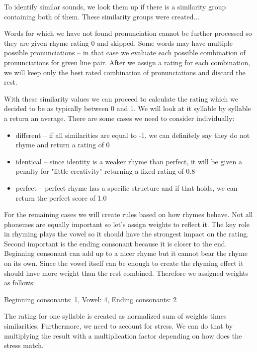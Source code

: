To identify similar sounds, we look them up if there is a similarity group containing both of them. These similarity groups were created... 

Words for which we have not found pronunciation cannot be further processed so they are given rhyme rating 0 and skipped. Some words may have multiple possible pronunciations -- in that case we evaluate each possible combination of pronunciations for given line pair. After we assign a rating for each combination, we will keep only the best rated combination of pronunciations and discard the rest. 


With these similarity values we can proceed to calculate the rating which we decided to be as typically between 0 and 1. We will look at it syllable by syllable a return an average. There are some cases we need to consider individually:

\begin{itemize}
	\item different -- if all similarities are equal to -1, we can definitely say they do not rhyme and return a rating of 0
	\item identical -- since identity is a weaker rhyme than perfect, it will be given a penalty for "little creativity" returning a fixed rating of 0.8
	\item perfect -- perfect rhyme has a specific structure and if that holds, we can return the perfect score of 1.0 
\end{itemize}

For the remaining cases we will create rules based on how rhymes behave. Not all phonemes are equally important so let's assign weights to reflect it. The key role in rhyming plays the vowel so it should have the strongest impact on the rating. Second important is the ending consonant because it is closer to the end. Beginning consonant can add up to a nicer rhyme but it cannot bear the rhyme on its own. Since the vowel itself can be enough to create the rhyming effect it should have more weight than the rest combined. Therefore we assigned weights as follows:

Beginning consonants: 1,
Vowel: 4,
Ending consonants: 2

The rating for one syllable is created as normalized sum of weights times similarities. Furthermore, we need to account for stress. We can do that by multiplying the result with a multiplication factor depending on how does the stress match.

